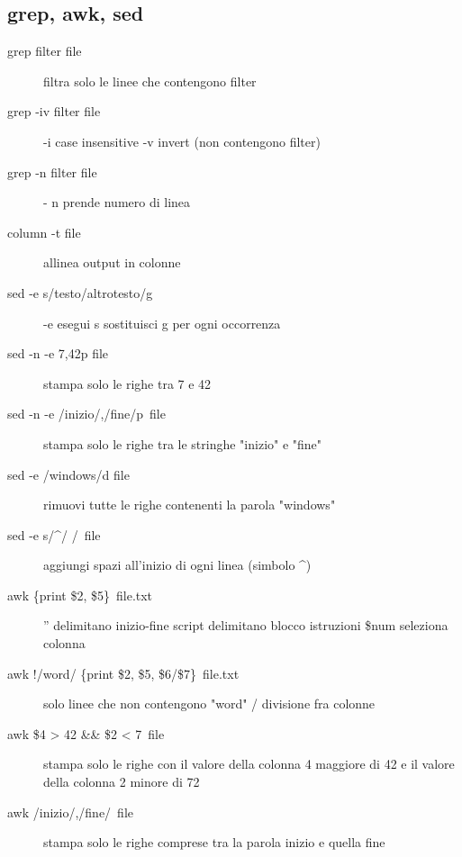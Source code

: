 \documentclass[a4paper, 12pt]{article}
\begin{document}
\subsection{grep, awk, sed}
\begin{description}
\item[grep filter file] filtra solo le linee che contengono filter
\item[grep -iv filter file] -i case insensitive -v invert (non contengono filter)
\item[grep -n filter file] - n prende numero di linea
\item[column -t file] allinea output in colonne\\
\item[sed -e \textquotesingle s/testo/altrotesto/g\textquotesingle] -e esegui s sostituisci g per ogni occorrenza
\item[sed -n -e 7,42p file] stampa solo le righe tra 7 e 42
\item[sed -n -e \textquotesingle/inizio/,/fine/p\textquotesingle\ file] stampa solo le righe tra le stringhe "inizio" e "fine"
\item[sed -e /windows/d file] rimuovi tutte le righe contenenti la parola "windows"
\item[sed -e \textquotesingle s/\^{}/ /\textquotesingle\ file] aggiungi spazi all'inizio di ogni linea (simbolo \^{})\\
\item[awk \textquotesingle\{print \$2, \$5\}\textquotesingle\   file.txt] '' delimitano inizio-fine script {} delimitano blocco istruzioni \$num seleziona colonna
\item[awk \textquotesingle!/word/ \{print \$2, \$5, \$6/\$7\}\textquotesingle\  file.txt] solo linee che non contengono "word" / divisione fra colonne
\item[awk \textquotesingle\$4 > 42 \&\& \$2 < 7\textquotesingle\   file] stampa solo le righe con il valore della colonna 4 maggiore di 42 e il valore della colonna 2 minore di 72
\item[awk \textquotesingle/inizio/,/fine/\textquotesingle\   file] stampa solo le righe comprese tra la parola inizio e quella fine

\end{description}
\end{document}

